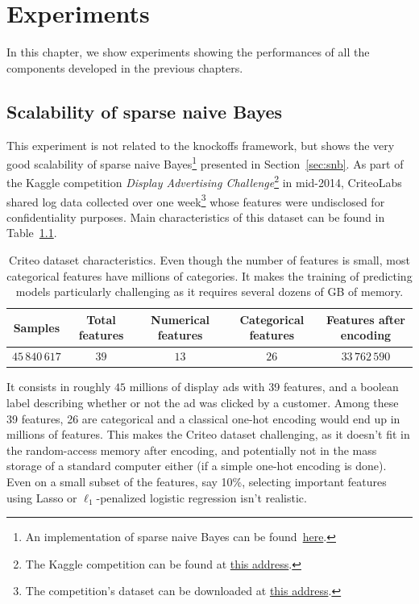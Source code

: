 \chapter{Experiments}\label{ch:exp}

In this chapter,
we show experiments showing the performances of all the components developed in the previous chapters.

\section{Scalability of sparse naive Bayes}\label{sec:snb_criteo}

This experiment is not related to the knockoffs framework,
but shows the very good scalability of sparse naive Bayes\footnote{
    An implementation of sparse naive Bayes can be found~\href{https://github.com/aspremon/NaiveFeatureSelection}{here}.
}
presented in Section~\ref{sec:snb}.
As part of the Kaggle competition \emph{Display Advertising Challenge}\footnote{
    The Kaggle competition can be found at
    \href{https://www.kaggle.com/c/criteo-display-ad-challenge}{this address}.
}
in mid-2014, CriteoLabs shared log data collected over one week\footnote{
    The competition's dataset can be downloaded at
    \href{https://labs.criteo.com/2014/02/download-kaggle-display-advertising-challenge-dataset/}{this address}.
}
whose features were undisclosed for confidentiality purposes.
Main characteristics of this dataset can be found in Table~\ref{tab:criteo_dataset}.
\begin{table}[!htb]
    \centering
    \setlength{\tabcolsep}{2pt}
    {\small
        \begin{tabular}{|c|c|c|c|c|}\hline
        \textbf{Samples} & \textbf{Total features} & \textbf{Numerical features} & \textbf{Categorical features} & \textbf{Features after encoding}\\ \hline
        $45\,840\,617$ & $39$  & $13$ & $26$ & $33\,762\,590$ \\ \hline
        \end{tabular}
    }%
    \caption[short]{
        Criteo dataset characteristics.
        Even though the number of features is small,
        most categorical features have millions of categories.
        It makes the training of predicting models particularly challenging as it requires several
        dozens of GB of memory.
    }
    \label{tab:criteo_dataset}
\end{table}
It consists in roughly $45$ millions of display ads with 39 features,
and a boolean label describing whether or not the ad was clicked by a customer.
Among these 39 features, 26 are categorical and a classical one-hot encoding would end up in millions of features.
This makes the Criteo dataset challenging, as it doesn't fit in the random-access memory after encoding,
and potentially not in the mass storage of a standard computer either (if a simple one-hot encoding is done).
Even on a small subset of the features, say 10\%,
selecting important features using Lasso or $\ell_1$-penalized logistic regression isn't realistic.

